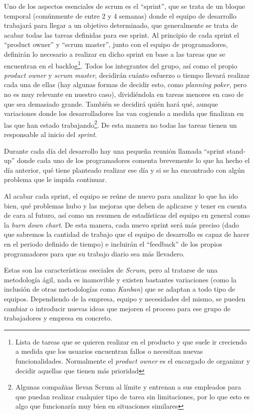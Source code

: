 Uno de los aspectos esenciales de scrum es el ``sprint'', que se trata de un bloque temporal (comúnmente de entre 2 y 4 semanas) donde el equipo de desarrollo trabajará para llegar a un objetivo determinado, que generalmente se trata de acabar todas las tareas definidas para ese sprint. 
Al principio de cada sprint  el ``product owner'' y ``scrum master'', junto con el equipo de programadores, definirán lo necesario a realizar en dicho sprint en base a las tareas que se encuentran en el backlog\footnote{Lista de tareas que se quieren realizar en el producto y que suele ir creciendo a medida que los usuarios encuentran fallos o necesitan nuevas funcionalidades. Normalmente el \textit{product owner} es el encargado de organizar y decidir aquellas que tienen más prioridad}. Todos los integrantes del grupo, así como el propio \textit{product owner} y \textit{scrum master}, decidirán cuánto esfuerzo o tiempo llevará realizar cada una de ellas (hay algunas formas de decidir esto, como \textit{planning poker}, pero no es muy relevante en nuestro caso), dividiéndola en tareas menores en caso de que sea demasiado grande. También se decidirá quién hará qué, aunque variaciones donde los desarrolladores las van cogiendo a medida que finalizan en las que han estado trabajando\footnote{Algunas compañias llevan Scrum al límite y entrenan a sus empleados para que puedan realizar cualquier tipo de tarea sin limitaciones, por lo que esto es algo que funcionaría muy bien en situaciones similares}. De esta manera no todas las tareas tienen un responsable al inicio del \textit{sprint}.

Durante cada día del desarrollo hay una pequeña reunión llamada ``sprint stand-up'' donde cada uno de los programadores comenta brevemente lo que ha hecho el día anterior, qué tiene planteado realizar ese día y si se ha encontrado con algún problema que le impida continuar.

Al acabar cada sprint, el equipo se reúne de nuevo para analizar lo que ha ido bien, qué problemas hubo y las mejoras que deben de aplicarse y tener en cuenta de cara al futuro, así como un resumen de estadísticas del equipo en general como la \textit{burn down chart}. De esta manera, cada nuevo sprint será más preciso (dado que sabremos la cantidad de trabajo que el equipo de desarrollo es capaz de hacer en el periodo definido de tiempo) e incluirán el ``feedback'' de los propios programadores para que su trabajo diario sea más llevadero.

Estas son las características eseciales de \textit{Scrum}, pero al tratarse de una metodología ágil, nada es inamovible y existen bastantes variaciones (como la inclusión de otras metodologías como \textit{Kanban}) que se adaptan a todo tipo de equipos. Dependiendo de la empresa, equipo y necesidades del mismo, se pueden cambiar o introducir nuevas ideas que mejoren el proceso para ese grupo de trabajadores y empresa en concreto.

